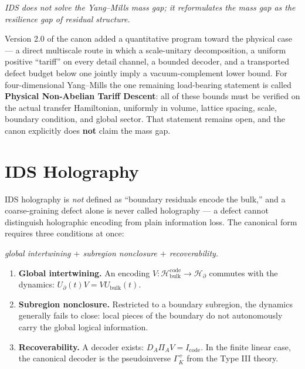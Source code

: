 \documentclass[11pt,a4paper]{article}
\newenvironment{canonbox}{\begin{mdframed}[style=canon]\itshape}{\end{mdframed}}
\theoremstyle{plain}
\begin{document}
\begin{canonbox}
IDS does not solve the Yang--Mills mass gap; it reformulates the mass gap as the resilience gap of residual structure.
\end{canonbox}

Version 2.0 of the canon added a quantitative program toward the physical case --- a direct multiscale route in which a scale-unitary decomposition, a uniform positive ``tariff'' on every detail channel, a bounded decoder, and a transported defect budget below one jointly imply a vacuum-complement lower bound. For four-dimensional Yang--Mills the one remaining load-bearing statement is called \textbf{Physical Non-Abelian Tariff Descent}: all of these bounds must be verified on the actual transfer Hamiltonian, uniformly in volume, lattice spacing, scale, boundary condition, and global sector. That statement remains open, and the canon explicitly does \textbf{not} claim the mass gap.

\section{IDS Holography}\label{sec:holography}

IDS holography is \emph{not} defined as ``boundary residuals encode the bulk,'' and a coarse-graining defect alone is never called holography --- a defect cannot distinguish holographic encoding from plain information loss. The canonical form requires three conditions at once:

\begin{canonbox}
global intertwining $+$ subregion nonclosure $+$ recoverability.
\end{canonbox}

\begin{enumerate}[itemsep=1pt,topsep=3pt]
\item \textbf{Global intertwining.} An encoding $V:\mathcal H_{\mathrm{bulk}}^{\mathrm{code}}\to\mathcal H_\partial$ commutes with the dynamics: $U_\partial(t)V=VU_{\mathrm{bulk}}(t)$.
\item \textbf{Subregion nonclosure.} Restricted to a boundary subregion, the dynamics generally fails to close: local pieces of the boundary do not autonomously carry the global logical information.
\item \textbf{Recoverability.} A decoder exists: $D_A\Pi_AV=I_{\mathrm{code}}$. In the finite linear case, the canonical decoder is the pseudoinverse $\Gamma_K^+$ from the Type III theory.
\end{enumerate}
\end{document}
